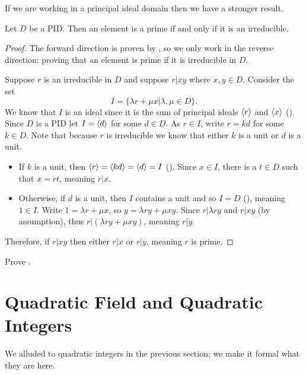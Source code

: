 If we are working in a principal ideal domain then we have a stronger result.
\begin{theorem}\label{thrm-in-PID-prime-iff-irreducible}
    Let $D$ be a PID. Then an element is a prime if and only if it is an irreducible.
\end{theorem}
\begin{proof}
    The forward direction is proven by , so we only work in the reverse direction: proving that an element is prime if it is irreducible in $D$.

    Suppose $r$ is an irreducible in $D$ and suppose $r \vert xy$ where $x, y \in D$. Consider the set
    \[
        I = \{\lambda r + \mu x \vert \lambda, \mu \in D\}.
    \]
    We know that $I$ is an ideal since it is the sum of principal ideals $\left\langle r\right\rangle$ and $\left\langle x\right\rangle$ (). Since $D$ is a PID let $I = \left\langle d\right\rangle$ for some $d \in D$. As $r \in I$, write $r = kd$ for some $k \in D$. Note that because $r$ is irreducible we know that either $k$ is a unit or $d$ is a unit.
    \begin{itemize}
        \item If $k$ is a unit, then $\left\langle r\right\rangle = \left\langle kd\right\rangle = \left\langle d\right\rangle = I$ (). Since $x \in I$, there is a $t \in D$ such that $x = rt$, meaning $r \vert x$.
        \item Otherwise, if $d$ is a unit, then $I$ contains a unit and so $I = D$ (), meaning $1 \in I$. Write $1 = \lambda r + \mu x$, so $y = \lambda ry + \mu xy$. Since $r \vert \lambda ry$ and $r \vert xy$ (by assumption), thus $r \vert (\lambda ry + \mu xy)$, meaning $r \vert y$.
    \end{itemize}
    Therefore, if $r \vert xy$ then either $r \vert x$ or $r \vert y$, meaning $r$ is prime.
\end{proof}
\begin{exercise}\label{exercise-associates-of-irreducible-is-irreducible}
    Prove .
\end{exercise}

\section{Quadratic Field and Quadratic Integers}
We alluded to quadratic integers in the previous section; we make it formal what they are here.

